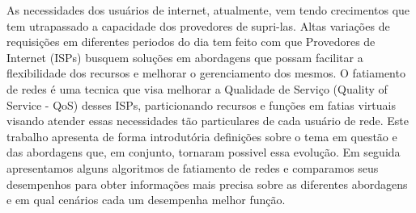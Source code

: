   As necessidades dos usuários de internet, atualmente, vem tendo crecimentos que tem utrapassado a capacidade dos provedores de supri-las. Altas variações de requisições em diferentes periodos do dia tem feito com que Provedores de Internet (ISPs) busquem soluções em abordagens que possam facilitar a flexibilidade dos recursos e melhorar o gerenciamento dos mesmos.
  O fatiamento de redes é uma tecnica que visa melhorar a Qualidade de Serviço (Quality of Service - QoS) desses ISPs, particionando recursos e funções em fatias virtuais visando atender essas necessidades tão particulares de cada usuário de rede. Este trabalho apresenta de forma introdutória definições sobre o tema em questão e das abordagens que, em conjunto, tornaram possivel essa evolução. Em seguida apresentamos alguns algoritmos de fatiamento de redes e comparamos seus desempenhos para obter informações mais precisa sobre as diferentes abordagens e em qual cenários cada um desempenha melhor função.